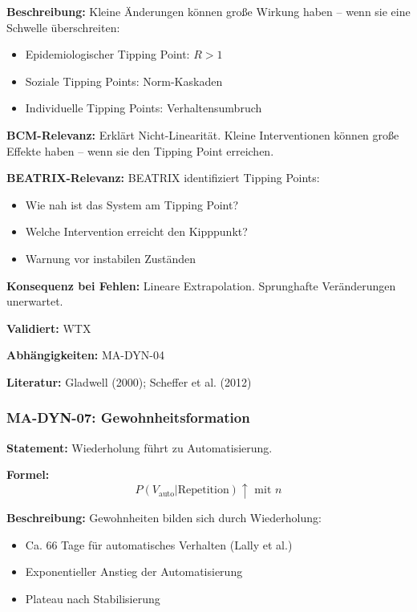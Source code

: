 \textbf{Beschreibung:}
Kleine Änderungen können große Wirkung haben -- wenn sie eine Schwelle überschreiten:
\begin{itemize}
    \item Epidemiologischer Tipping Point: $R > 1$
    \item Soziale Tipping Points: Norm-Kaskaden
    \item Individuelle Tipping Points: Verhaltensumbruch
\end{itemize}

\textbf{BCM-Relevanz:}
Erklärt Nicht-Linearität. Kleine Interventionen können große Effekte haben -- wenn sie den Tipping Point erreichen.

\textbf{BEATRIX-Relevanz:}
BEATRIX identifiziert Tipping Points:
\begin{itemize}
    \item Wie nah ist das System am Tipping Point?
    \item Welche Intervention erreicht den Kipppunkt?
    \item Warnung vor instabilen Zuständen
\end{itemize}

\textbf{Konsequenz bei Fehlen:}
Lineare Extrapolation. Sprunghafte Veränderungen unerwartet.

\textbf{Validiert:} WTX

\textbf{Abhängigkeiten:} MA-DYN-04

\textbf{Literatur:} Gladwell (2000); Scheffer et al. (2012)


\subsubsection*{MA-DYN-07: Gewohnheitsformation}

\textbf{Statement:} Wiederholung führt zu Automatisierung.

\textbf{Formel:}
\begin{equation}
P(V_{\text{auto}}|\text{Repetition}) \uparrow \text{ mit } n
\end{equation}

\textbf{Beschreibung:}
Gewohnheiten bilden sich durch Wiederholung:
\begin{itemize}
    \item Ca. 66 Tage für automatisches Verhalten (Lally et al.)
    \item Exponentieller Anstieg der Automatisierung
    \item Plateau nach Stabilisierung
\end{itemize}

